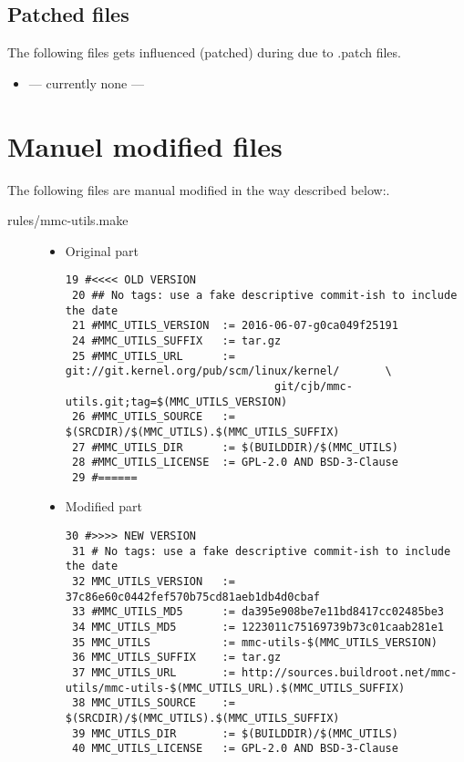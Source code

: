 \subsection{Patched files}%
\label{sub:Patched fiels}
The following files gets influenced (patched) during due to .patch files.

\begin{itemize}
    \item --- currently none ---
\end{itemize}


\section{Manuel modified files}%
\label{sec:Manuel modified files}

The following files are manual modified in the way described below:.

\begin{description}
    \item[rules/mmc-utils.make]
        \begin{itemize}
            \item Original part
                \begin{lstlisting}[caption={rules/mmc-utils}]
 19 #<<<< OLD VERSION
 20 ## No tags: use a fake descriptive commit-ish to include the date
 21 #MMC_UTILS_VERSION  := 2016-06-07-g0ca049f25191
 24 #MMC_UTILS_SUFFIX   := tar.gz
 25 #MMC_UTILS_URL      := git://git.kernel.org/pub/scm/linux/kernel/   	\
								git/cjb/mmc-utils.git;tag=$(MMC_UTILS_VERSION)
 26 #MMC_UTILS_SOURCE   := $(SRCDIR)/$(MMC_UTILS).$(MMC_UTILS_SUFFIX)
 27 #MMC_UTILS_DIR      := $(BUILDDIR)/$(MMC_UTILS)
 28 #MMC_UTILS_LICENSE  := GPL-2.0 AND BSD-3-Clause
 29 #======
                \end{lstlisting}
            \item Modified part

                \begin{lstlisting}[caption={rules/mmc-utils}]
30 #>>>> NEW VERSION
 31 # No tags: use a fake descriptive commit-ish to include the date
 32 MMC_UTILS_VERSION   := 37c86e60c0442fef570b75cd81aeb1db4d0cbaf
 33 #MMC_UTILS_MD5      := da395e908be7e11bd8417cc02485be3
 34 MMC_UTILS_MD5       := 1223011c75169739b73c01caab281e1
 35 MMC_UTILS           := mmc-utils-$(MMC_UTILS_VERSION)
 36 MMC_UTILS_SUFFIX    := tar.gz
 37 MMC_UTILS_URL       := http://sources.buildroot.net/mmc-utils/mmc-utils-$(MMC_UTILS_URL).$(MMC_UTILS_SUFFIX)
 38 MMC_UTILS_SOURCE    := $(SRCDIR)/$(MMC_UTILS).$(MMC_UTILS_SUFFIX)
 39 MMC_UTILS_DIR       := $(BUILDDIR)/$(MMC_UTILS)
 40 MMC_UTILS_LICENSE   := GPL-2.0 AND BSD-3-Clause
                \end{lstlisting}

        \end{itemize}
\end{description}

